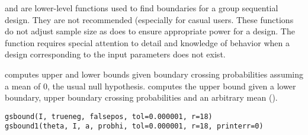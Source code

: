 \begin{Description}\relax
{} and  are lower-level functions used to find boundaries for a group sequential design.
They are not recommended (especially  for casual users.
These functions do not adjust sample size as  does to ensure appropriate power for a design.
The function  requires special attention to detail and knowledge of behavior when a design corresponding to the input
parameters does not exist.

 computes upper and lower bounds given boundary crossing probabilities assuming a mean of 0, the usual null hypothesis.
 computes the upper bound given a lower boundary, upper boundary crossing probabilities and an arbitrary mean 
().
\end{Description}
\begin{Usage}
\begin{verbatim}
gsbound(I, trueneg, falsepos, tol=0.000001, r=18)
gsbound1(theta, I, a, probhi, tol=0.000001, r=18, printerr=0)
\end{verbatim}
\end{Usage}

